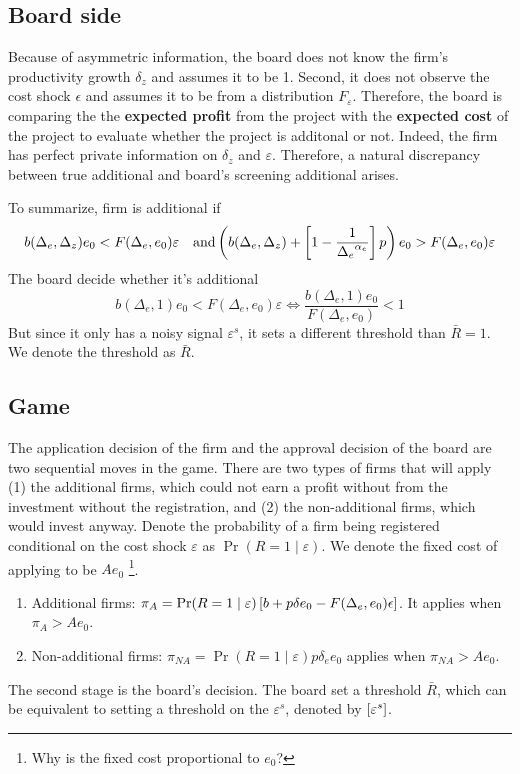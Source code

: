 \documentclass[12pt]{article}[margin=1in]
\begin{document}
\subsection{Board side}

Because of asymmetric information, the board does not know the firm's productivity growth $\delta_z$ and assumes it to be 1. Second, it does not observe the cost shock $\epsilon$ and assumes it to be from a distribution $F_\varepsilon$. Therefore, the board is comparing the the \textbf{expected profit} from the project with the \textbf{expected cost} of the project to evaluate whether the project is additonal or not. Indeed, the firm has perfect private information on $\delta_z$ and $\varepsilon$. Therefore, a natural discrepancy between true additional and board's screening additional arises.

To summarize, firm is additional if
$$b(\Delta_e,\Delta_z)e_0 < F(\Delta_e,e_0) \varepsilon \quad \text{and} \left(b(\Delta_e,\Delta_z)+\left[1-\frac{1}{{\Delta_e}^{\alpha_e}}\right] p\right)e_0 > F(\Delta_e,e_0) \varepsilon$$
The board decide whether it's additional
$$ b(\Delta_e,1)e_0 < F(\Delta_e,e_0)\varepsilon \Leftrightarrow \frac{b(\Delta_e,1)e_0}{F(\Delta_e,e_0)}<1$$
But since it only has a noisy signal $\varepsilon^s$, it sets a different threshold than $\bar{R}=1$. We denote the threshold as $\bar{R}$.

\subsection{Game}
The application decision of the firm and the approval decision of the board are two sequential moves in the game.
There are two types of firms that will apply (1) the additional firms, which could not earn a profit without from the investment without the registration, and (2) the non-additional firms, which would invest anyway. Denote the probability of a firm being registered conditional on the cost shock $\varepsilon$ as $\Pr(R=1\mid\varepsilon)$. We denote the fixed cost of applying to be $Ae_0$ \footnote{Why is the fixed cost proportional to $e_0$?}.
\begin{enumerate}
    \item Additional firms: $\pi_A=\Pr(R=1\mid\varepsilon)\left[b+p\delta e_0-F(\Delta_e,e_0)\epsilon\right]$. It applies when $\pi_A>Ae_0$.
    \item Non-additional firms: $\pi_{NA}=\Pr(R=1\mid\varepsilon) p\delta_e e_0$ applies when $\pi_{NA}>Ae_0$.
\end{enumerate}
The second stage is the board's decision. The board set a threshold $\bar{R}$, which can be equivalent to setting a threshold on the $\varepsilon^s$, denoted by $\left[\varepsilon^s\right]$.
\end{document}
